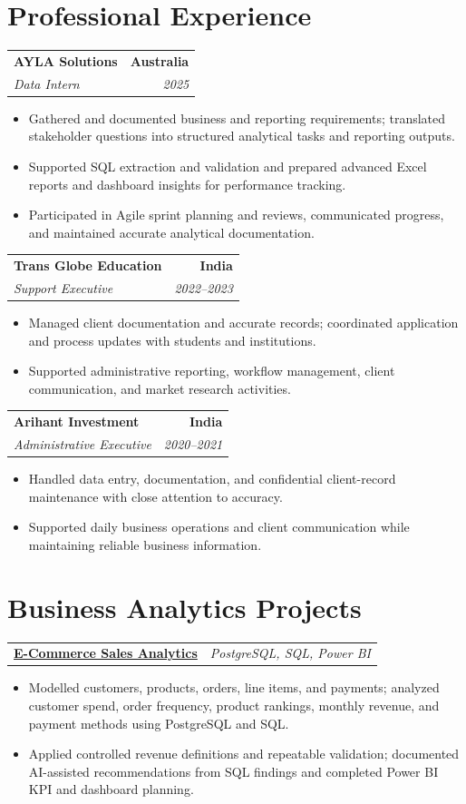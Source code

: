 \documentclass[letterpaper,10pt]{article}
\makeatletter
\newcommand{\role}[4]{%
  \begin{tabularx}{\textwidth}{@{}Xr@{}}
    \textbf{#1} & \textbf{#2} \\
    \textit{#3} & \textit{#4}
  \end{tabularx}\vspace{-1pt}
}
\newcommand{\project}[2]{%
  \begin{tabularx}{\textwidth}{@{}Xr@{}}
    \textbf{#1} & \textit{#2}
  \end{tabularx}\vspace{-1pt}
}
\makeatother
\begin{document}
\section{Professional Experience}
\role{AYLA Solutions}{Australia}{Data Intern}{2025}
\begin{itemize}
  \item Gathered and documented business and reporting requirements; translated stakeholder questions into structured analytical tasks and reporting outputs.
  \item Supported SQL extraction and validation and prepared advanced Excel reports and dashboard insights for performance tracking.
  \item Participated in Agile sprint planning and reviews, communicated progress, and maintained accurate analytical documentation.
\end{itemize}
\vspace{1pt}

\role{Trans Globe Education}{India}{Support Executive}{2022--2023}
\begin{itemize}
  \item Managed client documentation and accurate records; coordinated application and process updates with students and institutions.
  \item Supported administrative reporting, workflow management, client communication, and market research activities.
\end{itemize}
\vspace{1pt}

\role{Arihant Investment}{India}{Administrative Executive}{2020--2021}
\begin{itemize}
  \item Handled data entry, documentation, and confidential client-record maintenance with close attention to accuracy.
  \item Supported daily business operations and client communication while maintaining reliable business information.
\end{itemize}

\section{Business Analytics Projects}
\project{\href{https://github.com/jainalimehta/Ecommerce-Sales-Analytics}{E-Commerce Sales Analytics}}{PostgreSQL, SQL, Power BI}
\begin{itemize}
  \item Modelled customers, products, orders, line items, and payments; analyzed customer spend, order frequency, product rankings, monthly revenue, and payment methods using PostgreSQL and SQL.
  \item Applied controlled revenue definitions and repeatable validation; documented AI-assisted recommendations from SQL findings and completed Power BI KPI and dashboard planning.
\end{itemize}
\vspace{1pt}
\end{document}

